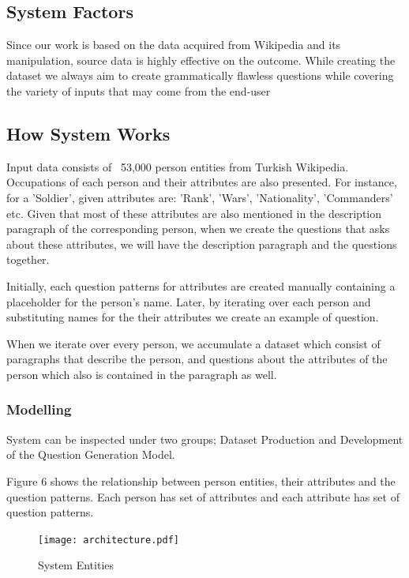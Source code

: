 \documentclass{mefsdp}
\begin{document}
	\subsection{System Factors}
	Since our work is based on the data acquired from Wikipedia and its manipulation, source data is highly effective on the outcome. While creating the dataset we always aim to create grammatically flawless questions while covering the variety of inputs that may come from the end-user
	
	\subsection{How System Works}
	Input data consists of ~53,000 person entities from Turkish Wikipedia. Occupations of each person and their attributes are also presented. For instance, for a 'Soldier', given attributes are: 'Rank', 'Wars', 'Nationality', 'Commanders' etc. Given that most of these attributes are also mentioned in the description paragraph of the corresponding person, when we create the questions that asks about these attributes, we will have the description paragraph and the questions together. 
	
	Initially, each question patterns for attributes are created manually containing a placeholder for the person's name. Later, by iterating over each person and substituting names for the their attributes we create an example of question. 
	
	When we iterate over every person, we accumulate a dataset which consist of paragraphs that describe the person, and questions about the attributes of the person which also is contained in the paragraph as well.  
	
	\subsubsection{Modelling}
	
	System can be inspected under two groups; Dataset Production and Development of the Question Generation Model. \newline \par
	
	Figure 6 shows the relationship between person entities, their attributes and the question patterns. Each person has set of attributes and each attribute has set of question patterns. \newline \par
	
	\begin{figure}[h]
		\centering
		\texttt{[image: architecture.pdf]}
		\caption{System Entities\label{per-attr-qp}}
	\end{figure}
	
\end{document}
